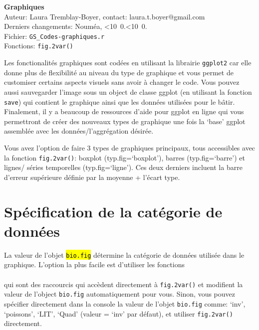 \documentclass[12pt]{article}
\begin{document}
\def\mydate{\leavevmode\hbox{\twodigits\day.\twodigits\month.\the\year}}
\def\twodigits#1{\ifnum#1<10 0\fi\the#1}

{\Large \textbf{Graphiques}}\\
Auteur: Laura Tremblay-Boyer, contact: laura.t.boyer@gmail.com\\
Derniers changements: Nouméa, \mydate\\



Fichier: \texttt{GS\_Codes-graphiques.r}\\
Fonctions: \texttt{fig.2var()}

Les fonctionalités graphiques sont codées en utilisant la librairie \texttt{ggplot2} car elle donne plus de flexibilité au niveau du type de graphique et vous permet de customiser certains aspects visuels sans avoir à changer le code. Vous pouvez aussi sauvegarder l'image sous un object de classe ggplot (en utilisant la fonction \texttt{save}) qui contient le graphique ainsi que les données utilisées pour le bâtir. Finalement, il y a beaucoup de ressources d'aide pour ggplot en ligne qui vous permettront de créer des nouveaux types de graphique une fois la ‘base’ ggplot assemblée avec les données/l’aggrégation désirée.

Vous avez l'option de faire 3 types de graphiques principaux, tous accessibles avec la fonction \texttt{fig.2var()}: boxplot (typ.fig=`boxplot'), barres (typ.fig=`barre') et lignes/ séries temporelles (typ.fig=`ligne'). Ces deux derniers incluent la barre d'erreur supérieure définie par la moyenne + l'écart type.

\section{Spécification de la catégorie de données}
La valeur de l'objet \texttt{\hl{bio.fig}} détermine la catégorie de données utilisée dans le graphique. L'option la plus facile est d'utiliser les fonctions\\

\texttt{}\\

qui sont des raccourcis qui accèdent directement à \texttt{fig.2var()} et modifient la valeur de l'object \texttt{bio.fig} automatiquement pour vous. Sinon, vous pouvez spécifier directement dans la console la valeur de l'objet \texttt{bio.fig} comme: `inv', `poissons', `LIT', `Quad' (valeur = `inv' par défaut), et utiliser \texttt{fig.2var()} directement.
\end{document}
